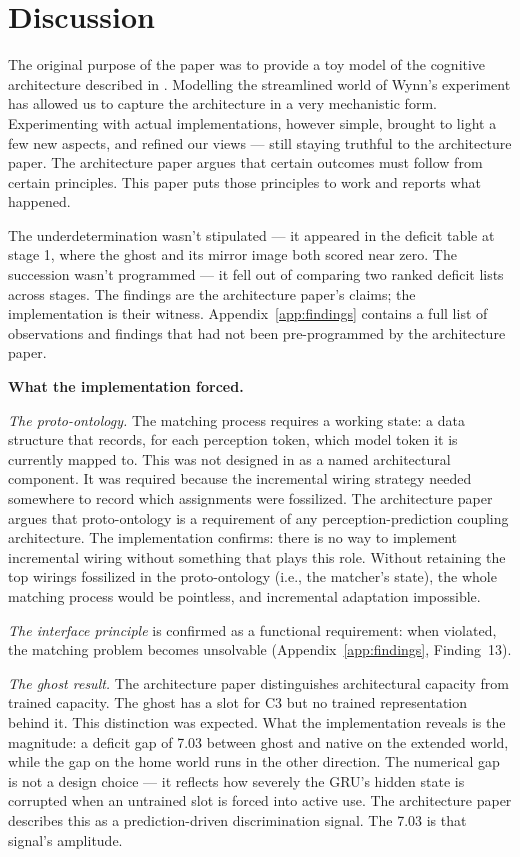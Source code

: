 \documentclass[12pt, a4paper]{article}
\begin{document}
\section{Discussion}
\label{sec:discussion}

The original purpose of the paper was to provide a toy model of the cognitive
architecture described in \cite{architecture}. Modelling the streamlined world
of Wynn's experiment has allowed us to capture the architecture in a very
mechanistic form. Experimenting with actual implementations, however simple,
brought to light a few new aspects, and refined our views --- still staying
truthful to the architecture paper. The architecture paper argues that certain
outcomes must follow from certain principles. This paper puts those principles
to work and reports what happened.

The underdetermination wasn't stipulated --- it appeared in the deficit table
at stage 1, where the ghost and its mirror image both scored near zero. The
succession wasn't programmed --- it fell out of comparing two ranked deficit
lists across stages. The findings are the architecture paper's claims; the
implementation is their witness. Appendix~\ref{app:findings} contains a full
list of observations and findings that had not been pre-programmed by the
architecture paper.

\textbf{What the implementation forced.}

\textit{The proto-ontology.} The matching process requires a working state: a
data structure that records, for each perception token, which model token it is
currently mapped to. This was not designed in as a named architectural
component. It was required because the incremental wiring strategy needed
somewhere to record which assignments were fossilized. The architecture paper
argues that proto-ontology is a requirement of any perception-prediction
coupling architecture. The implementation confirms: there is no way to
implement incremental wiring without something that plays this role. Without
retaining the top wirings fossilized in the proto-ontology (i.e., the
matcher's state), the whole matching process would be pointless, and
incremental adaptation impossible.

\textit{The interface principle} is confirmed as a functional requirement: when
violated, the matching problem becomes unsolvable
(Appendix~\ref{app:findings}, Finding~13).

\textit{The ghost result.} The architecture paper distinguishes architectural
capacity from trained capacity. The ghost has a slot for C3 but no trained
representation behind it. This distinction was expected. What the
implementation reveals is the magnitude: a deficit gap of 7.03 between ghost
and native on the extended world, while the gap on the home world runs in the
other direction. The numerical gap is not a design choice --- it reflects how
severely the GRU's hidden state is corrupted when an untrained slot is forced
into active use. The architecture paper describes this as a prediction-driven
discrimination signal. The 7.03 is that signal's amplitude.
\end{document}
